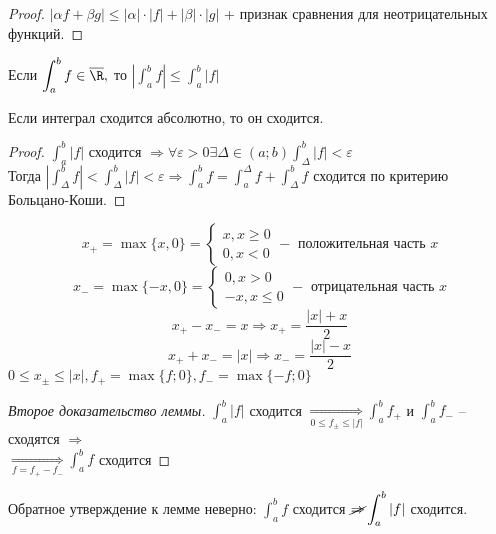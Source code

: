 \begin{proof}
	$|\alpha f + \beta g| \leqslant |\alpha| \cdot |f| + |\beta| \cdot |g|$ + признак сравнения для неотрицательных функций.
\end{proof}

\begin{Rem}
	Если $\displaystyle \int_{a}^{b} f \in \overline{\R},$ то $\displaystyle \left| \int_{a}^{b} f \right| \leqslant \int_{a}^{b}|f|$
\end{Rem}

\begin{Lm}
	Если интеграл сходится абсолютно, то он сходится.
\end{Lm}

\begin{proof}
	$\displaystyle \int_{a}^{b} |f|$ сходится $\displaystyle \Rightarrow \forall \varepsilon > 0 \exists \Delta \in (a;b) \int_{\Delta}^{b} |f| < \varepsilon$\\
	Тогда $\displaystyle \left| \int_{\Delta}^{b} f \right| < \int_{\Delta}^{b} |f| < \varepsilon \Rightarrow 
	\int_{a}^{b} f = \int_{a}^{\Delta} f + \int_{\Delta}^{b} f$ сходится по критерию Больцано-Коши.
\end{proof}

\begin{Def} 
	$$x_+= \max\{x,0\} = \begin{cases} x, x \geqslant 0\\ 0, x<0 \end{cases} - \textrm{ положительная часть }x$$
	$$x_-= \max\{-x,0\} = \begin{cases} 0, x > 0\\ -x, x \leqslant 0 \end{cases} - \textrm{ отрицательная часть } x$$
	$$x_+ - x_- = x \displaystyle \Rightarrow x_+ = \frac{|x|+x}{2}$$
	$$x_+ + x_- = |x| \Rightarrow x_- = \frac{|x|-x}{2}$$
	$0 \leqslant x_{\pm} \leqslant |x|, f_+ = \max \{f;0\}, f_- = \max \{-f;0\}$
\end{Def} 

\begin{proof}[Второе доказательство леммы]
	$\displaystyle \int_{a}^{b} |f|$ сходится $\displaystyle \underset{0 \leqslant f_{\pm} \leqslant|f|}{\Rightarrow} \int_{a}^{b} f_+$ и $\displaystyle \int_{a}^{b} f_-$ -- сходятся $\Rightarrow$ \\ 
	$\displaystyle \underset{f = f_+ - f_-}{\Rightarrow} \int_{a}^{b} f$ сходится 
\end{proof}

\begin{Rem}
	Обратное утверждение к лемме неверно:
	$\displaystyle \int_{a}^{b} f$ сходится $\displaystyle \cancel{\Rightarrow} \int_{a}^{b} |f|$ сходится.
\end{Rem}

